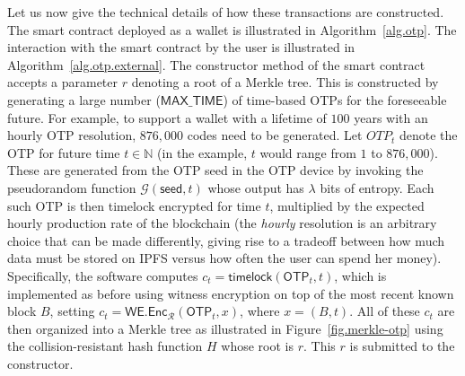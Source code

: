 Let us now give the technical details of how these transactions are constructed.
The smart contract deployed as a wallet is illustrated in Algorithm~\ref{alg.otp}.
The interaction with the smart contract by the user is illustrated in Algorithm~\ref{alg.otp.external}.
The constructor method of the smart contract accepts a parameter $r$
denoting a root of a Merkle tree. This is constructed by generating a large number ($\textsf{MAX\_TIME}$)
of time-based OTPs for the foreseeable future. For example, to support a wallet with
a lifetime of $100$ years with an hourly OTP resolution, $876{,}000$ codes need to
be generated. Let ${OTP}_t$ denote the OTP for future time $t \in \mathbb{N}$ (in
the example, $t$ would range from $1$ to $876{,}000$). These are generated from
the OTP seed in the OTP device by invoking the pseudorandom function
$\mathcal{G}(\textsf{seed}, t)$ whose output has $\lambda$ bits of entropy.
Each such OTP is then timelock encrypted for time $t$, multiplied by the expected
hourly production rate of the blockchain (the \emph{hourly} resolution is an arbitrary
choice that can be made differently, giving rise to a tradeoff between how much
data must be stored on IPFS versus how often the user can spend her money).
Specifically, the software computes $c_t = \textsf{timelock}(\textsf{OTP}_t, t)$,
which is implemented as before using witness encryption on top of the most recent
known block $B$, setting $c_t = \textsf{WE.Enc}_\mathcal{R}(\textsf{OTP}_t, x)$, where $x = (B, t)$.
All of these $c_t$ are then organized into a Merkle tree as illustrated in
Figure~\ref{fig.merkle-otp}
using the collision-resistant hash function $H$ whose root is $r$. This $r$ is submitted
to the constructor.

